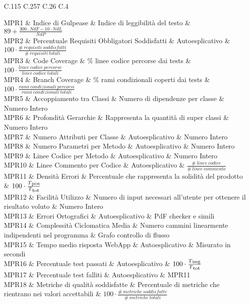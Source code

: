{\begin{longtable}{C{.115\freewidth} C{.257\freewidth} C{.26\freewidth} C{.4\freewidth}}
    
    MPR1 & Indice di Gulpease & Indice di leggibilità del testo & $89+\frac{300\cdot NdF-10\cdot NdL}{NdP}$  \\
    MPR2 & Percentuale Requisiti Obbligatori Soddisfatti & Autoesplicativo & $100\cdot \frac{\# \: requisiti \: soddisfatti}{\# \: requisiti \: totali}$ \\
    MPR3 & Code Coverage & \% linee codice percorse dai tests & $100\cdot \frac{linee \: codice \: percorse}{linee \: codice \: totali}$ \\
    MPR4 & Branch Coverage & \% rami condizionali coperti dai tests  & $100\cdot \frac{rami \: condizionali \: percorsi}{rami \: condizionali \: totali}$ \\
    MPR5 & Accoppiamento tra Classi & Numero di dipendenze per classe & Numero Intero \\
    MPR6 & Profondità Gerarchie & Rappresenta la quantità di super classi & Numero Intero \\
    MPR7 & Numero Attributi per Classe & Autoesplicativo & Numero Intero \\
    MPR8 & Numero Parametri per Metodo & Autoesplicativo & Numero Intero \\
    MPR9 & Linee Codice per Metodo & Autoesplicativo & Numero Intero \\
    MPR10 & Linee Commento per Codice & Autoesplicativo & $\frac{\# \: linee \: codice}{\# \: linee \: commento}$ \\
    MPR11 & Densità Errori & Percentuale che rappresenta la solidità del prodotto & $100\cdot \frac{T\textsubscript{pos}}{T\textsubscript{tot}}$ \\
    MPR12 & Facilità Utilizzo  & Numero di input necessari all'utente per ottenere il risultato voluto & Numero Intero \\
    MPR13 & Errori Ortografici & Autoesplicativo & PdF checker e simili \\
    MPR14 & Complessità Ciclomatica Media & Numero cammini linearmente indipendenti nel programma & Grafo controllo di flusso \\
    MPR15 & Tempo medio risposta WebApp & Autoesplicativo & Misurato in secondi \\
    MPR16 & Percentuale test passati & Autoesplicativo & $100\cdot \frac{T\textsubscript{neg}}{ T\textsubscript{tot}}$ \\
    MPR17 & Percentuale test falliti & Autoesplicativo & MPR11 \\
    MPR18 & Metriche di qualità soddisfatte & Percentuale di metriche che rientrano nei valori accettabili & $100\cdot \frac{\# \: metriche \: soddisfatte}{\# \: metriche \: totali}$ \\	   
    \bottomrule
    \caption{Tabella metriche per qualità di processo}
    \end{longtable}
}
